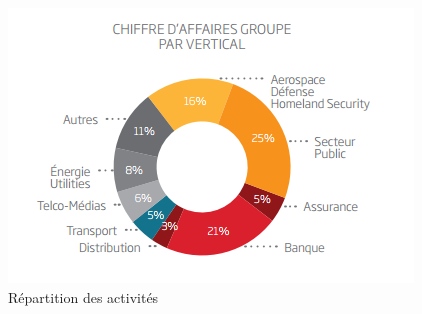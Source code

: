 \begin{figure}[h]
	\includegraphics[scale=1]{images/sopraSteriaActivites.png}
	\centering
	\caption{Répartition des activités}
	\label{sopraSteriaActivites}
\end{figure}
		